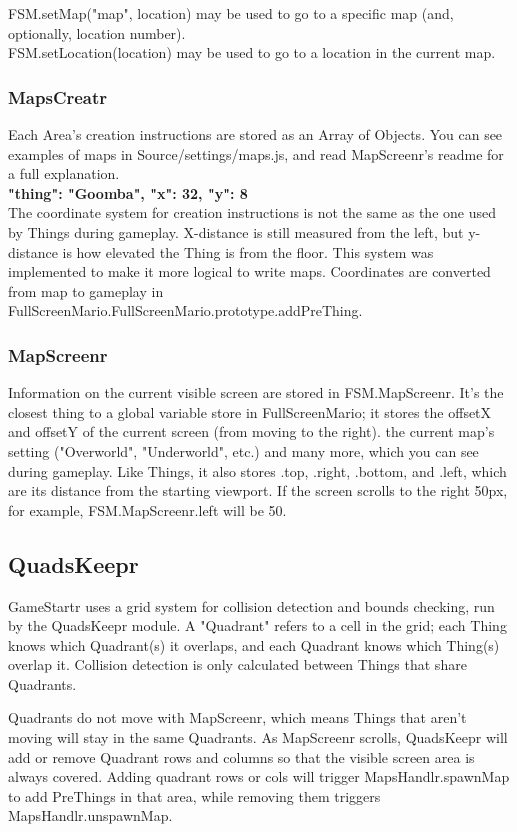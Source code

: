 \documentclass{article}
\begin{document}
FSM.setMap("map", location) may be used to go to a specific map (and, optionally, location number).\\ FSM.setLocation(location) may be used to go to a location in the current map.
\subsubsection{MapsCreatr}
Each Area's creation instructions are stored as an Array of Objects. You can see examples of maps in Source/settings/maps.js, and read MapScreenr's readme for a full explanation.\\
\textbf{{
    "thing": "Goomba",
    "x": 32,
    "y": 8
}}\\
The coordinate system for creation instructions is not the same as the one used by Things during gameplay. X-distance is still measured from the left, but y-distance is how elevated the Thing is from the floor. This system was implemented to make it more logical to write maps. Coordinates are converted from map to gameplay in FullScreenMario.FullScreenMario.prototype.addPreThing.
\subsubsection{MapScreenr}
Information on the current visible screen are stored in FSM.MapScreenr. It's the closest thing to a global variable store in FullScreenMario; it stores the offsetX and offsetY of the current screen (from moving to the right). the current map's setting ("Overworld", "Underworld", etc.) and many more, which you can see during gameplay. Like Things, it also stores .top, .right, .bottom, and .left, which are its distance from the starting viewport. If the screen scrolls to the right 50px, for example, FSM.MapScreenr.left will be 50.
\subsection{QuadsKeepr}
GameStartr uses a grid system for collision detection and bounds checking, run by the QuadsKeepr module. A "Quadrant" refers to a cell in the grid; each Thing knows which Quadrant(s) it overlaps, and each Quadrant knows which Thing(s) overlap it. Collision detection is only calculated between Things that share Quadrants.

Quadrants do not move with MapScreenr, which means Things that aren't moving will stay in the same Quadrants. As MapScreenr scrolls, QuadsKeepr will add or remove Quadrant rows and columns so that the visible screen area is always covered. Adding quadrant rows or cols will trigger MapsHandlr.spawnMap to add PreThings in that area, while removing them triggers MapsHandlr.unspawnMap.
\pagebreak
\end{document}
